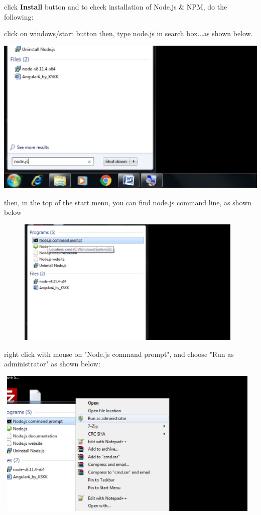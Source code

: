 \documentclass{article}
\begin{document}
\begin{enumerate}
\begin{enumerate}
	  	\noindent click \textbf{Install} button and to check installation of Node.js \& NPM, do the following:
	  	
	  	\noindent click on windows/start button then, type node.js in search box...as shown below.
	  	
	  	\begin{center}
	  		\noindent \includegraphics*[width=5.26in, height=2.96in]{IMG-01-07}
	  	\end{center}
	  	
	  	\noindent then, in the top of the start menu, you can find node.js command line, as shown below
	  	
	  	\begin{center}
	  		\noindent \includegraphics*[width=5.12in, height=2.40in]{IMG-01-08}
	  	\end{center}
	  	
	  	\noindent right click with mouse on "Node.js command prompt", and choose "Run as administrator" as shown below:
	  	
	  	\begin{center}
	  		\noindent \includegraphics*[width=5.12in, height=2.80in]{IMG-01-09}
	  	\end{center}
	  	

\end{enumerate}
\end{enumerate}
\end{document}
